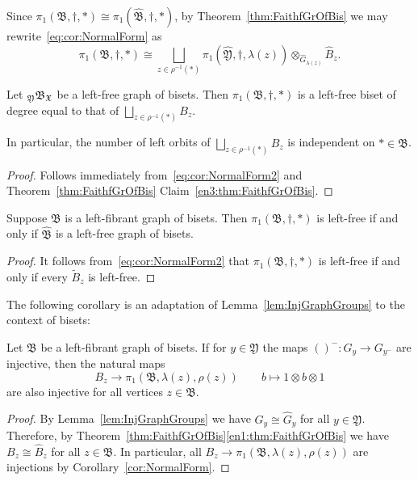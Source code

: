 \documentclass{amsart}
\begin{document}
Since $\pi_1(\mathfrak B, \dagger, *)\cong \pi_1(\widehat{ \mathfrak B}, \dagger, *)$, by Theorem~\ref{thm:FaithfGrOfBis} we may rewrite~\eqref{eq:cor:NormalForm} as 
  \begin{equation}
  \label{eq:cor:NormalForm2}
    \pi_1(\mathfrak B,\dagger,*)\cong \bigsqcup_{z\in \rho^{-1}(*)}\pi_1(\widehat{\mathfrak Y},\dagger,\lambda(z))\otimes_{\widehat G_{\lambda(z)}}\widehat B_z.
\end{equation}


\begin{cor}\label{cor:HatBisLeftFree}
  Let ${}_{\mathfrak Y}\mathfrak B_{\mathfrak X}$ be a left-free graph of
  bisets.  Then $\pi_1(\mathfrak B, \dagger, *)$ is a left-free biset
  of degree equal to that of $\bigsqcup_{z\in\rho^{-1}(*)} B_z$.
\end{cor}
\noindent In particular, the number of left orbits of
$\bigsqcup_{z\in\rho^{-1}(*)}\widehat B_z$ is independent on
$*\in \mathfrak B$.
\begin{proof}
  Follows immediately from~\eqref{eq:cor:NormalForm2} and
  Theorem~\ref{thm:FaithfGrOfBis} Claim~\ref{en3:thm:FaithfGrOfBis}.
\end{proof}


\begin{lem}
  Suppose $\mathfrak B$ is a left-fibrant graph of bisets. Then
  $\pi_1(\mathfrak B, \dagger, *)$ is left-free if and only if
  $\widehat{\mathfrak B}$ is a left-free graph of bisets.
\end{lem}
\begin{proof}
  It follows from~\eqref{eq:cor:NormalForm2} that
  $\pi_1(\mathfrak B, \dagger, *)$ is left-free if and only if every
  $\widetilde {B}_z$ is left-free.
\end{proof}
\noindent The following corollary is an adaptation of
Lemma~\ref{lem:InjGraphGroups} to the context of bisets:
\begin{cor}
  Let $\mathfrak B$ be a left-fibrant graph of bisets. If for $y\in
  \mathfrak Y$ the maps $()^-\colon G_y\to G_{y^-}$ are injective, then the
  natural maps
  \[B_z\to\pi_1(\mathfrak B,\lambda(z),\rho(z))\qquad b\mapsto 1\otimes b
  \otimes 1
  \]
  are also injective for all vertices $z\in\mathfrak B$.
\end{cor}
\begin{proof}
  By Lemma~\ref{lem:InjGraphGroups} we have $G_y \cong \widehat G_y$ for
  all $y\in \mathfrak Y$. Therefore, by
  Theorem~\ref{thm:FaithfGrOfBis}\eqref{en1:thm:FaithfGrOfBis} we have
  $B_z\cong \widehat B_z$ for all $z\in \mathfrak B$. In particular, all
  $B_z\to\pi_1(\mathfrak B,\lambda(z),\rho(z))$ are injections by
  Corollary~\ref{cor:NormalForm}.
\end{proof}
\end{document}
